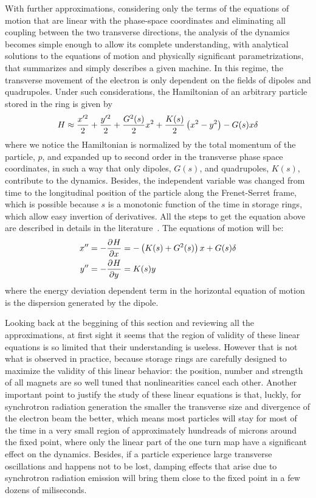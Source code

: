 	With further approximations, considering only the terms of the equations of motion that are linear with the phase-space coordinates and eliminating all coupling between the two transverse directions, the analysis of the dynamics becomes simple enough to allow its complete understanding, with analytical solutions to the equations of motion and physically significant parametrizations, that summarizes and simply describes a given machine. In this regime, the transverse movement of the electron is only dependent on the fields of dipoles and quadrupoles. Under such considerations, the Hamiltonian of an arbitrary particle stored in the ring is given by
    \begin{align}\label{eq:approximated_hamiltonian}
        H \approx \frac{x'^2}{2} + \frac{y'^2}{2} + \frac{G^2(s)}{2}x^2 + \frac{K(s)}{2}\left(x^2-y^2\right) - G(s)x\delta
    \end{align}
    where we notice the Hamiltonian is normalized by the total momentum of the particle, $p$, and expanded up to second order in the transverse phase space coordinates, in such a way that only dipoles, $G(s)$, and quadrupoles, $K(s)$, contribute to the dynamics. Besides, the independent variable was changed from time to the longitudinal position of the particle along the Frenet-Serret frame, which is possible because $s$ is a monotonic function of the time in storage rings, which allow easy invertion of derivatives. All the steps to get the equation above are described in details in the literature~\cite{Bengtsson1997,Lee1999,Wiedemann2007}. The equations of motion will be:
    \begin{align}\label{eq:linear_equation_motion}
        x'' &= -\frac{\partial^{{}}H}{\partial x^{{}}} = -\left(K(s)+G^2(s)\right)x + G(s)\delta\\\nonumber
        y'' &= -\frac{\partial^{{}}H}{\partial y^{{}}} = K(s)y
    \end{align}
    where the energy deviation dependent term in the horizontal equation of motion is the dispersion generated by the dipole.

	Looking back at the beggining of this section and reviewing all the approximations, at first sight it seems that the region of validity of these linear equations is so limited that their understanding is useless. However that is not what is observed in practice, because storage rings are carefully designed to maximize the validity of this linear behavior: the position, number and strength of all magnets are so well tuned that nonlinearities cancel each other. Another important point to justify the study of these linear equations is that, luckly, for synchrotron radiation generation the smaller the transverse size and divergence of the electron beam the better, which means most particles will stay for most of the time in a very small region of approximately hundreads of microns around the fixed point, where only the linear part of the one turn map have a significant effect on the dynamics. Besides, if a particle experience large transverse oscillations and happens not to be lost, damping effects that arise due to synchrotron radiation emission will bring them close to the fixed point in a few dozens of miliseconds.

